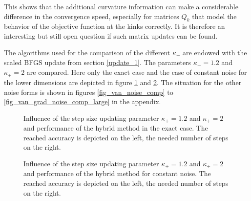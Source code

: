 This shows that the additional curvature information can make a considerable difference in the convergence speed, especially for matrices \(Q_k\) that model the behavior of the objective function at the kinks correctly.
It is therefore an interesting but still open question if such matrix updates can be found.

The algorithms used for the comparison of the different \(\kappa_+\) are endowed with the scaled BFGS update from section \ref{update_1}. The parameters \(\kappa_+ = 1.2\) and \(\kappa_+ = 2\) are compared.
Here only the exact case and the case of constant noise for the lower dimensions are depicted in figure \ref{fig_no_noise_comp} and \ref{fig_const_noise_comp}. The situation for the other noise forms is shown in figures \ref{fig_van_noise_comp} to \ref{fig_van_grad_noise_comp_large}  in the appendix.

\begin{figure}[ht]%
	\begin{subfigure}{0.49\textwidth}
	\end{subfigure}
	\begin{subfigure}{0.49\textwidth}
	\end{subfigure}
	\caption[Influence of the step size updating parameter and hybrid method: no noise]{Influence of the step size updating parameter \(\kappa_+ = 1.2\) and \(\kappa_+ =2 \) and performance of the hybrid method in the exact case. The reached accuracy is depicted on the left, the needed number of steps on the right.}
	\label{fig_no_noise_comp}
\end{figure}

\begin{figure}[ht]%
	\begin{subfigure}{0.49\textwidth}
	\end{subfigure}
	\begin{subfigure}{0.49\textwidth}
	\end{subfigure}
	\caption[Influence of the step size updating parameter and hybrid method: constant noise]{Influence of the step size updating parameter \(\kappa_+ = 1.2\) and \(\kappa_+ =2 \) and performance of the hybrid method for constant noise. The reached accuracy is depicted on the left, the needed number of steps on the right.}
	\label{fig_const_noise_comp}
\end{figure}


